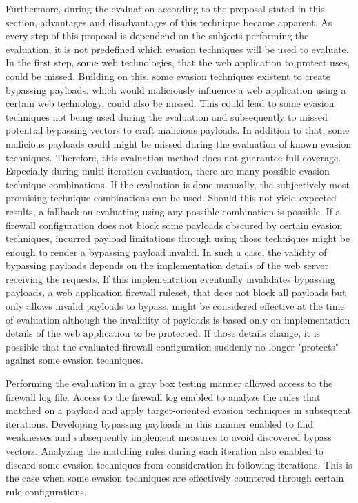 Furthermore, during the evaluation according to the proposal stated in this section, advantages and disadvantages of this technique became apparent. As every step of this proposal is dependend on the subjects performing the evaluation, it is not predefined which evasion techniques will be used to evaluate.
In the first step, some web technologies, that the web application to protect uses, could be missed. Building on this, some evasion techniques existent to create bypassing payloads, which would maliciously influence a web application using a certain web technology, could also be missed. 
This could lead to some evasion techniques not being used during the evaluation and subsequently to missed potential bypassing vectors to craft malicious payloads. In addition to that, some malicious payloads could might be missed during the evaluation of known evasion techniques. 
Therefore, this evaluation method does not guarantee full coverage. 
Especially during multi-iteration-evaluation, there are many possible evasion technique combinations. If the evaluation is done manually, the subjectively most promising technique combinations can be used. Should this not yield expected results, a fallback on evaluating using any possible combination is possible.
If a firewall configuration does not block some payloads obscured by certain evasion techniques, incurred payload limitations through using those techniques might be enough to render a bypassing payload invalid. In such a case, the validity of bypassing payloads depends on the implementation details of the web server receiving the requests. 
If this implementation eventually invalidates bypassing payloads, a web application firewall ruleset, that does not block all payloads but only allows invalid payloads to bypass, might be considered effective at the time of evaluation although the invalidity of payloads is based only on implementation details of the web application to be protected. 
If those details change, it is possible that the evaluated firewall configuration suddenly no longer "protects" against some evasion techniques.

Performing the evaluation in a gray box testing manner allowed access to the firewall log file. Access to the firewall log enabled to analyze the rules that matched on a payload and apply target-oriented evasion techniques in subsequent iterations. Developing bypassing payloads in this manner enabled to find weaknesses and subsequently implement measures to avoid discovered bypass vectors. Analyzing the matching rules during each iteration also enabled to discard some evasion techniques from consideration in following iterations. This is the case when some evasion techniques are effectively countered through certain rule configurations. 


